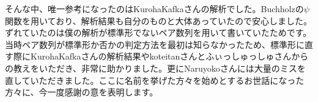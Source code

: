 \documentclass[dvipdfmx,uplatex]{jsarticle}
\theoremstyle{customnonumberbreakfortheorem}
\theoremstyle{customnonumberbreakforproof}
\begin{document}
そんな中、唯一参考になったのはKurohaKafkaさんの解析でした。Buchholzの\(\psi\)関数を用いており、解析結果も自分のものと大体あっていたので安心しました。ずれていたのは僕の解析が標準形でないペア数列を用いて書いていたためです。当時ペア数列が標準形か否かの判定方法を最初は知らなかったため、標準形に直す際にKurohaKafkaさんの解析結果やkoteitanさんとふぃっしゅっしゅさんからの教えをいただき、非常に助かりました。更にNaruyokoさんには大量のミスを直していただきました。ここに名前を挙げた方々を始めとするお世話になった方々に、今一度感謝の意を表明します。

\fi
\end{document}
